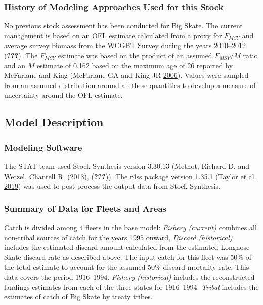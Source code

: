 \documentclass[12pt,]{article}
\begin{document}
\hypertarget{history-of-modeling-approaches-used-for-this-stock}{%
\subsubsection{History of Modeling Approaches Used for this
Stock}\label{history-of-modeling-approaches-used-for-this-stock}}

No previous stock assessment has been conducted for Big Skate. The
current management is based on an OFL estimate calculated from a proxy
for \(F_{MSY}\) and average survey biomass from the WCGBT Survey during
the years 2010--2012 ({\textbf{???}}). The \(F_{MSY}\) estimate was
based on the product of an assumed \(F_{MSY}/M\) ratio and an \(M\)
estimate of 0.162 based on the maximum age of 26 reported by McFarlane
and King (McFarlane GA and King JR
\protect\hyperlink{ref-McFandKing2006}{2006}). Values were sampled from
an assumed distribution around all these quantities to develop a measure
of uncertainty around the OFL estimate.

\hypertarget{model-description}{%
\subsection{Model Description}\label{model-description}}

\hypertarget{modeling-software}{%
\subsubsection{Modeling Software}\label{modeling-software}}

The STAT team used Stock Synthesis version 3.30.13 (Methot, Richard D.
and Wetzel, Chantell R. (\protect\hyperlink{ref-Methot2013}{2013}),
({\textbf{???}})). The r4ss package version 1.35.1 (Taylor et al.
\protect\hyperlink{ref-Taylor2019}{2019}) was used to post-process the
output data from Stock Synthesis.

\hypertarget{summary-of-data-for-fleets-and-areas}{%
\subsubsection{Summary of Data for Fleets and
Areas}\label{summary-of-data-for-fleets-and-areas}}

Catch is divided among 4 fleets in the base model: \emph{Fishery
(current)} combines all non-tribal sources of catch for the years 1995
onward, \emph{Discard (historical)} includes the estimated discard
amount calculated from the estimated Longnose Skate discard rate as
described above. The input catch for this fleet was 50\% of the total
estimate to account for the assumed 50\% discard mortality rate. This
data covers the period 1916--1994. \emph{Fishery (historical)} includes
the reconstructed landings estimates from each of the three states for
1916--1994. \emph{Tribal} includes the estimates of catch of Big Skate
by treaty tribes.
\end{document}

